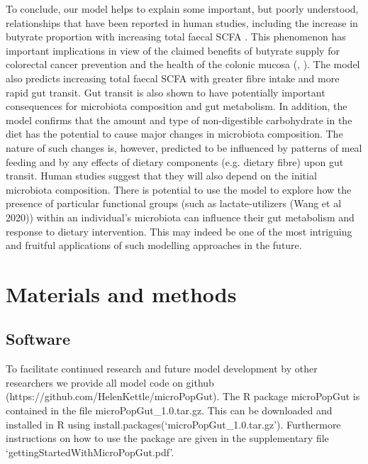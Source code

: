 \documentclass[a4paper]{article}
\begin{document}
To conclude, our model helps to explain some important, but poorly understood, relationships that have been reported in human studies, including the increase in butyrate proportion with increasing total faecal SCFA \citep{labouyer}. This phenomenon has important implications in view of the claimed benefits of butyrate supply for colorectal cancer prevention and the health of the colonic mucosa (\cite{louis2014}, \cite{hamer2008}). 
The model also predicts increasing total faecal SCFA with greater fibre intake and more rapid gut transit.
Gut transit is also shown to have potentially important consequences for microbiota composition and gut metabolism. In addition, the model confirms that the amount and type of non-digestible carbohydrate in the diet has the potential to cause major changes in microbiota composition. 
The nature of such changes is, however, predicted to be influenced by patterns of meal feeding and by any effects of dietary components (e.g. dietary fibre) upon gut transit. 
Human studies suggest that they will also depend on the initial microbiota composition. 
There is potential to use the model to explore how the presence of particular functional groups (such as lactate-utilizers (Wang et al 2020)) within an individual's microbiota can influence their gut metabolism and response to dietary intervention. This may indeed be one of the most intriguing and fruitful applications of such modelling approaches in the future.

\section*{Materials and methods}

\subsection*{Software}
To facilitate continued research and future model development by other researchers we provide all model code on github (https://github.com/HelenKettle/microPopGut). The R package microPopGut is contained in the file microPopGut\_1.0.tar.gz. This can be downloaded and installed in R using install.packages(`microPopGut\_1.0.tar.gz'). Furthermore instructions on how to use the package are given in the supplementary file `gettingStartedWithMicroPopGut.pdf'.
\end{document}

